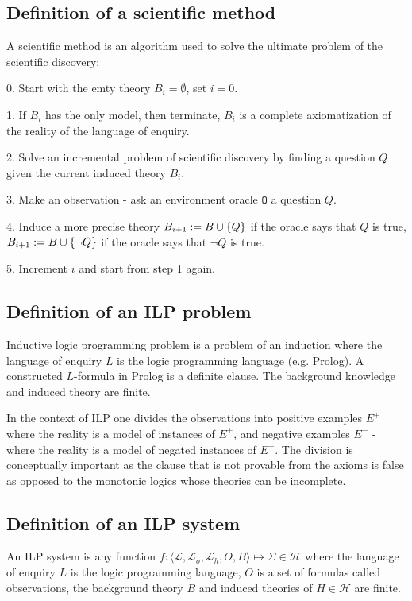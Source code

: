 \subsection{Definition of a scientific method}
\label{scientific_method}
A scientific method is an algorithm used to solve the ultimate problem of the scientific discovery:

0. Start with the emty theory $B_i=\emptyset$, set $i=0$.

1. If $B_i$ has the only model, then terminate, $B_i$ is a complete axiomatization of the reality of the language of enquiry.

2. Solve an incremental problem of scientific discovery by finding a question $Q$ given the current induced theory $B_i$.

3. Make an observation - ask an environment oracle $\mathtt{O}$ a question $Q$.

4. Induce a more precise theory $B_{i+1}:=B \cup \{Q\}$ if the oracle says that $Q$ is true, $B_{i+1}:=B \cup \{\neg Q\}$ if the oracle says that $\neg Q$ is true.

5. Increment $i$ and start from step 1 again.

\subsection{Definition of an ILP problem}
Inductive logic programming problem is a problem of an induction where the language of enquiry $L$ is the logic programming language (e.g. Prolog). A constructed $L$-formula in Prolog is a definite clause. The background knowledge and induced theory are finite.

In the context of ILP one divides the observations into positive examples $E^+$ where the reality is a model of instances of $E^+$, and negative examples $E^-$ - where the reality is a model of negated instances of $E^-$. The division is conceptually important as the clause that is not provable from the axioms is false as opposed to the monotonic logics whose theories can be incomplete.

\subsection{Definition of an ILP system}
An ILP system is any function $f:\langle\mathcal{L}, \mathcal{L}_o, \mathcal{L}_h, O, B\rangle \mapsto \Sigma \in \mathcal{H}$ where the language of enquiry $L$ is the logic programming language, $O$ is a set of formulas called observations, the background theory $B$ and induced theories of $H \in \mathcal{H}$ are finite.

